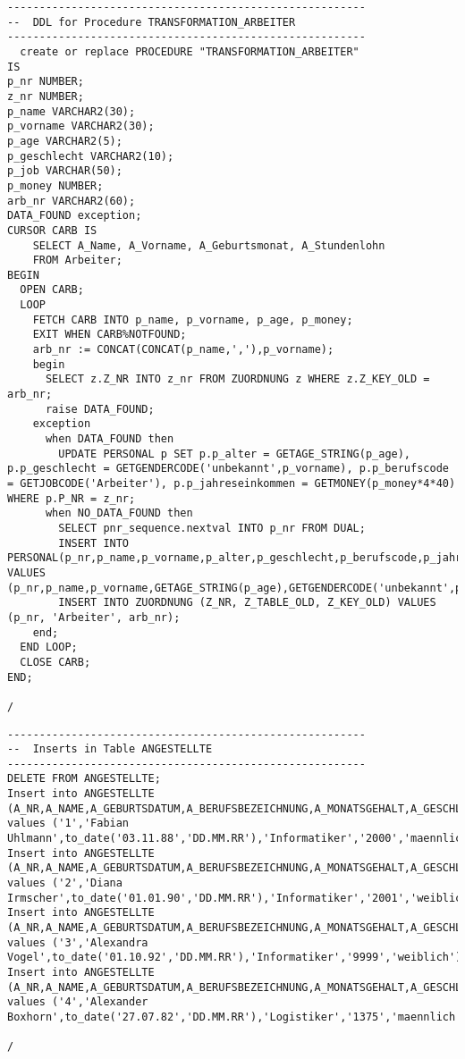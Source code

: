 \documentclass{scrartcl}
\begin{document}
\begin{lstlisting}
--------------------------------------------------------
--  DDL for Procedure TRANSFORMATION_ARBEITER
--------------------------------------------------------
  create or replace PROCEDURE "TRANSFORMATION_ARBEITER" 
IS
p_nr NUMBER;
z_nr NUMBER;
p_name VARCHAR2(30);
p_vorname VARCHAR2(30);
p_age VARCHAR2(5);
p_geschlecht VARCHAR2(10);
p_job VARCHAR(50);
p_money NUMBER;
arb_nr VARCHAR2(60);
DATA_FOUND exception;
CURSOR CARB IS
	SELECT A_Name, A_Vorname, A_Geburtsmonat, A_Stundenlohn
	FROM Arbeiter;
BEGIN
  OPEN CARB;
  LOOP 
    FETCH CARB INTO p_name, p_vorname, p_age, p_money;
    EXIT WHEN CARB%NOTFOUND;
    arb_nr := CONCAT(CONCAT(p_name,','),p_vorname);
    begin 
      SELECT z.Z_NR INTO z_nr FROM ZUORDNUNG z WHERE z.Z_KEY_OLD = arb_nr;
      raise DATA_FOUND;
    exception
      when DATA_FOUND then
        UPDATE PERSONAL p SET p.p_alter = GETAGE_STRING(p_age), p.p_geschlecht = GETGENDERCODE('unbekannt',p_vorname), p.p_berufscode = GETJOBCODE('Arbeiter'), p.p_jahreseinkommen = GETMONEY(p_money*4*40) WHERE p.P_NR = z_nr;
      when NO_DATA_FOUND then
        SELECT pnr_sequence.nextval INTO p_nr FROM DUAL;
        INSERT INTO PERSONAL(p_nr,p_name,p_vorname,p_alter,p_geschlecht,p_berufscode,p_jahreseinkommen) VALUES (p_nr,p_name,p_vorname,GETAGE_STRING(p_age),GETGENDERCODE('unbekannt',p_vorname),GETJOBCODE('Arbeiter'),GETMONEY(p_money*4*40));
        INSERT INTO ZUORDNUNG (Z_NR, Z_TABLE_OLD, Z_KEY_OLD) VALUES (p_nr, 'Arbeiter', arb_nr);
    end;
  END LOOP; 
  CLOSE CARB;
END;

/
\end{lstlisting}

\begin{lstlisting}
--------------------------------------------------------
--  Inserts in Table ANGESTELLTE
--------------------------------------------------------
DELETE FROM ANGESTELLTE;
Insert into ANGESTELLTE (A_NR,A_NAME,A_GEBURTSDATUM,A_BERUFSBEZEICHNUNG,A_MONATSGEHALT,A_GESCHLECHT) values ('1','Fabian Uhlmann',to_date('03.11.88','DD.MM.RR'),'Informatiker','2000','maennlich');
Insert into ANGESTELLTE (A_NR,A_NAME,A_GEBURTSDATUM,A_BERUFSBEZEICHNUNG,A_MONATSGEHALT,A_GESCHLECHT) values ('2','Diana Irmscher',to_date('01.01.90','DD.MM.RR'),'Informatiker','2001','weiblich');
Insert into ANGESTELLTE (A_NR,A_NAME,A_GEBURTSDATUM,A_BERUFSBEZEICHNUNG,A_MONATSGEHALT,A_GESCHLECHT) values ('3','Alexandra Vogel',to_date('01.10.92','DD.MM.RR'),'Informatiker','9999','weiblich');
Insert into ANGESTELLTE (A_NR,A_NAME,A_GEBURTSDATUM,A_BERUFSBEZEICHNUNG,A_MONATSGEHALT,A_GESCHLECHT) values ('4','Alexander Boxhorn',to_date('27.07.82','DD.MM.RR'),'Logistiker','1375','maennlich');

/
\end{lstlisting}
\end{document}
